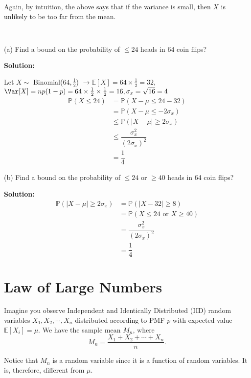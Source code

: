 Again, by intuition, the above says that if the variance is small, then \(X\) is unlikely to be too far from the mean. 

\begin{eg}~ 

    (a) Find a bound on the probability of \(\leq 24\) heads in 64 coin flips?

    \textbf{Solution:} 

    Let \(X \sim\) Binomial(\(64, \frac{1}{2}\)) \(\rightarrow \mathbb{E}[X] = 64 \times \frac{1}{2} = 32\), \(\Var[X] = np(1 - p) = 64 \times \frac{1}{2} \times \frac{1}{2} = 16, \sigma_x = \sqrt{16} = 4 \) 
    \[
        \begin{aligned}
            \mathbb{P}(X \leq 24) &= \mathbb{P}(X - \mu \leq 24 - 32) \\
            &= \mathbb{P}(X - \mu \leq -2\sigma_x) \\
            &\leq \mathbb{P}(\vert X - \mu \vert \geq 2\sigma_x) \\
            &\leq \dfrac{\sigma_{x}^2}{(2\sigma_{x})^2} \\
            &= \dfrac{1}{4}
        \end{aligned}
    \]

    (b) Find a bound on the probability of \(\leq 24\) or \(\geq 40\) heads in 64 coin flips?

    \textbf{Solution:} 
    \[
        \begin{aligned}
            \mathbb{P}(\vert X - \mu \vert \geq 2\sigma_x) &= \mathbb{P}(\vert X - 32 \vert \geq 8) \\
            &= \mathbb{P}(X \leq 24 \text{ or } X \geq 40) \\
            &= \dfrac{\sigma_{x}^2}{(2\sigma_{x})^2} \\
            &= \dfrac{1}{4}
        \end{aligned}
    \]
\end{eg}

\section{Law of Large Numbers}
Imagine you observe Independent and Identically Distributed (IID)
random variables \(X_1, X_2, \cdots, X_n\) distributed according to PMF \(p\) with expected value \(\mathbb{E}[X_i] = \mu\). We have the sample mean \(M_n\), where 
\[
    M_n = \dfrac{X_1 + X_2 + \cdots + X_n}{n}.
\] 

Notice that \(M_n\) is a random variable since it is a function of random variables. It is, therefore, different from \(\mu\). 

